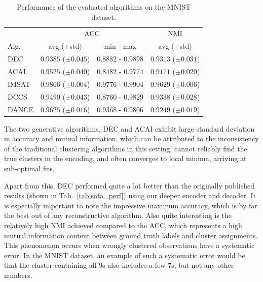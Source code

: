			
			\begin{table}[!ht]
				\centering
				\renewcommand{\arraystretch}{1.25}
				\begin{tabular}{l|c|c|c}
					& \multicolumn{2}{c|}{ACC}                     & NMI \\
					\cline{2-4}
					Alg.       & avg ($\pm$std)         & min - max           & avg ($\pm$std) \\
					\hline
					\ac{DEC}   & $0.9385$ ($\pm0.045$) & $0.8882$ - $0.9898$ & $0.9313$ ($\pm0.031$) \\
					\ac{ACAI}  & $0.9525$ ($\pm0.040$) & $0.8482$ - $0.9774$ & $0.9171$ ($\pm0.020$) \\
					\ac{IMSAT} & $\mathbf{0.9866}$ ($\pm0.004$) & $\mathbf{0.9776}$ - $\mathbf{0.9904}$ & $\mathbf{0.9629}$ ($\pm0.006$) \\
					\ac{DCCS}  & $0.9490$ ($\pm0.043$) & $0.8760$ - $0.9829$ & $0.9338$ ($\pm0.028$) \\
					\ac{DANCE} & $0.9625$ ($\pm0.016$) & $0.9368$ - $0.9806$ & $0.9249$ ($\pm0.019$) \\
				\end{tabular}
				\caption[Re-evaluated deep clustering algorithm performance on MNIST]{Performance of the evaluated algorithms on the MNIST dataset.}
				\label{tab:mnist_perf}
			\end{table}
			
			The two generative algorithms, \ac{DEC} and \ac{ACAI} exhibit large standard deviation in accuracy and mutual information, which can be attributed to the inconsistency of the traditional clustering algorithms in this setting; \kmeans{} cannot reliably find the true clusters in the encoding, and often converges to local minima, arriving at sub-optimal fits.
			
			Apart from this, \ac{DEC} performed quite a lot better than the originally published results (shown in Tab.~\ref{tab:sota_perf}) using our deeper encoder and decoder.
			It is especially important to note the impressive maximum accuracy, which is by far the best out of any reconstructive algorithm.
			Also quite interesting is the relatively high \ac{NMI} achieved compared to the \ac{ACC}, which represents a high mutual information content between ground truth labels and cluster assignments.
			This phenomenon occurs when wrongly clustered observations have a systematic error.
			In the MNIST dataset, an example of such a systematic error would be that the cluster containing all $9$s also includes a few $7$s, but not any other numbers.
			

